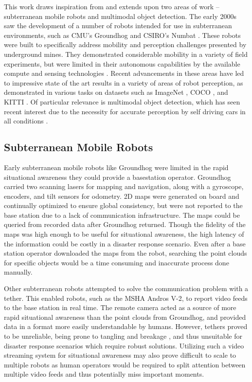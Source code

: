 This work draws inspiration from and extends upon two areas of work -- subterranean mobile robots and multimodal object detection. The early 2000s saw the development of a number of robots intended for use in subterranean environments, such as CMU's Groundhog \cite{ferguson2004autonomous} and CSIRO's Numbat \cite{ralston1998numbat}. These robots were built to specifically address mobility and perception challenges presented by underground mines. They demonstrated considerable mobility in a variety of field experiments, but were limited in their autonomous capabilities by the available compute and sensing technologies \cite{morris2006recent}. Recent advancements in these areas have led to impressive state of the art results in a variety of areas of robot perception, as demonstrated in various tasks on datasets such as ImageNet \cite{deng2009imagenet}, COCO \cite{lin2014microsoft}, and KITTI \cite{Geiger2013IJRR}. Of particular relevance is multimodal object detection, which has seen recent interest due to the necessity for accurate perception by self driving cars in all conditions \cite{feng2019deep}.

\subsection{Subterranean Mobile Robots}

Early subterranean mobile robots like Groundhog were limited in the rapid situational awareness they could provide a basestation operator. Groundhog carried two scanning lasers for mapping and navigation, along with a gyroscope, encoders, and tilt sensors for odometry. 2D maps were generated on board and continually optimized to ensure global consistency, but were not reported to the base station due to a lack of communication infrastructure. The maps could be queried from recorded data after Groundhog returned. Though the fidelity of the maps was high enough to be useful for situational awareness, the high latency of the information could be costly in a disaster response scenario. Even after a base station operator downloaded the maps from the robot, searching the point clouds for specific objects would be a time consuming and inaccurate process done manually.

Other subterranean robots attempted to solve the communication problem with a tether. This enabled robots, such as the MSHA Andros V-2, to report video feeds to the base station in real time. The remote camera acted as a source of more rapid situational awareness than the point clouds from Groundhog, and provided data in a format more easily understandable by humans. However, tethers proved to be unreliable, being prone to tangling and breakage \cite{murphy2009mobile}, and thus unsuitable for disaster response scenarios which require robust solutions. Utilizing such a video streaming system for situational awareness may also prove difficult to scale to multiple robots as human operators would be required to split attention between multiple video feeds and thus potentially miss important moments.

